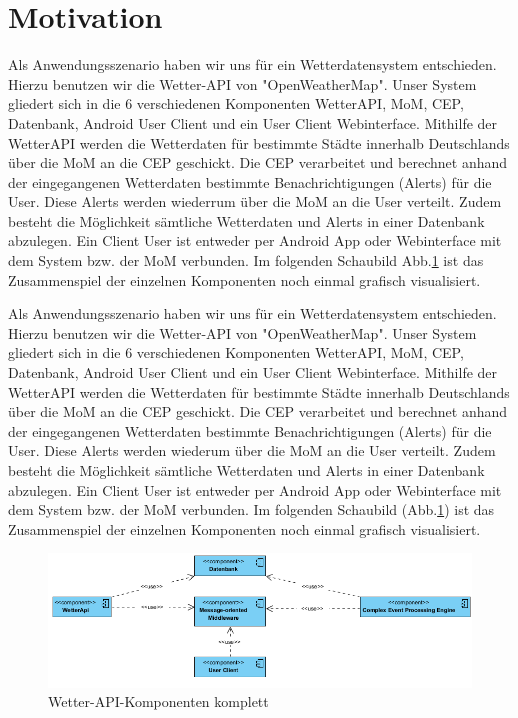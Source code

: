 \section{Motivation}


Als Anwendungsszenario haben wir uns für ein Wetterdatensystem entschieden. Hierzu benutzen wir die Wetter-API von "OpenWeatherMap". Unser System gliedert sich in die 6 verschiedenen Komponenten WetterAPI, MoM, CEP, Datenbank, Android  User Client und ein User Client Webinterface. Mithilfe der WetterAPI werden die Wetterdaten für bestimmte Städte innerhalb Deutschlands über die MoM an die CEP geschickt. Die CEP verarbeitet und berechnet anhand der eingegangenen Wetterdaten bestimmte Benachrichtigungen (Alerts) für die User. Diese Alerts werden wiederrum über die MoM an die User verteilt.  Zudem besteht die Möglichkeit sämtliche Wetterdaten und Alerts in einer Datenbank abzulegen. Ein Client User ist entweder per Android App oder Webinterface mit dem System bzw. der MoM verbunden.
Im folgenden Schaubild Abb.\ref{img:KomponentenKomplett} ist das Zusammenspiel der einzelnen Komponenten noch einmal grafisch visualisiert.

Als Anwendungsszenario haben wir uns für ein Wetterdatensystem entschieden. Hierzu benutzen wir die Wetter-API von "OpenWeatherMap". Unser System gliedert sich in die 6 verschiedenen Komponenten WetterAPI, MoM, CEP, Datenbank, Android  User Client und ein User Client Webinterface. Mithilfe der WetterAPI werden die Wetterdaten für bestimmte Städte innerhalb Deutschlands über die MoM an die CEP geschickt. Die CEP verarbeitet und berechnet anhand der eingegangenen Wetterdaten bestimmte Benachrichtigungen (Alerts) für die User. Diese Alerts werden wiederum über die MoM an die User verteilt.  Zudem besteht die Möglichkeit sämtliche Wetterdaten und Alerts in einer Datenbank abzulegen. Ein Client User ist entweder per Android App oder Webinterface mit dem System bzw. der MoM verbunden.
Im folgenden Schaubild (Abb.\ref{img:KomponentenKomplett}) ist das Zusammenspiel der einzelnen Komponenten noch einmal grafisch visualisiert.

\begin{figure}[!ht]
	\centering
	\includegraphics[width=1.0\textwidth]{Bilder/alleKomponenten.PNG}
	\caption{Wetter-API-Komponenten komplett}
	\label{img:KomponentenKomplett}
\end{figure}


